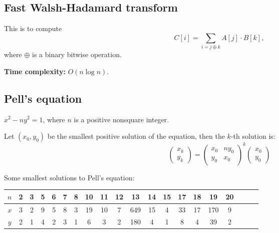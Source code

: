 \subsection{Fast Walsh-Hadamard transform}
This is to compute $$C[i] = \sum_{i = j \oplus k} A[j] \cdot B[k],$$ where $\oplus$ is a binary bitwise operation. \par
\textbf{Time complexity:} $O(n \log n)$. \par


\subsection{Pell's equation}
$x^2 - ny^2 = 1$, where $n$ is a positive nonsquare integer. \par
Let $(x_0, y_0)$ be the smallest positive solution of the equation, then the $k$-th solution is:
$$\begin{pmatrix}x_k \\ y_k\end{pmatrix} =
\begin{pmatrix}
  x_0 & ny_0 \\
  y_0 & x_0
\end{pmatrix} ^k
\begin{pmatrix}x_0 \\ y_0\end{pmatrix}$$

Some smallest solutions to Pell's equation:

\begin{table}[h]
  \centering
  \begin{tabular}{|c|c|c|c|c|c|c|c|c|c|c|c|c|c|c|c|c|c|c|c|}
  \hline
  $n$ & 2 & 3 & 5 & 6 & 7 & 8 & 10 & 11 & 12 & 13  & 14 & 15 & 17 & 18 & 19 & 20 \\ \hline
  $x$ & 3 & 2 & 9 & 5 & 8 & 3 & 19 & 10 & 7  & 649 & 15 & 4 & 33 & 17 & 170 & 9 \\ \hline
  $y$ & 2 & 1 & 4 & 2 & 3 & 1 & 6  & 3  & 2  & 180 & 4  & 1 & 8 & 4 & 39 & 2 \\ \hline
  \end{tabular}
\end{table}





